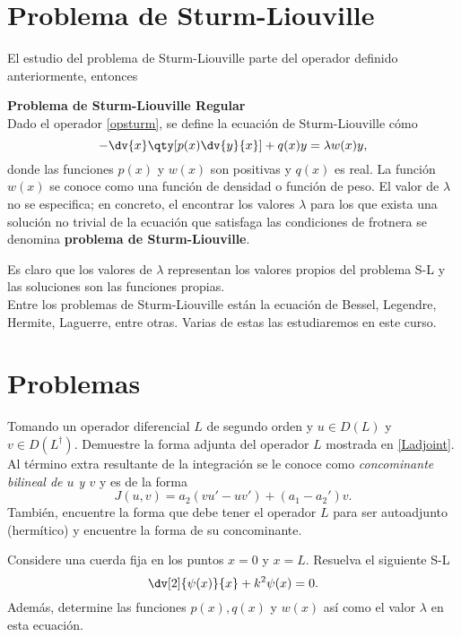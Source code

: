 \section*{Problema de Sturm-Liouville}
 
El estudio del problema de Sturm-Liouville parte del operador definido anteriormente, entonces

\begin{mdframed}[style=warning]
	{\Large \textbf{Problema de Sturm-Liouville Regular}} \\
	Dado el operador \eqref{opsturm}, se define la ecuación de Sturm-Liouville cómo
		$$ -\dv{x} \qty[p(x)\dv{y}{x}] + q(x) y = \lambda w(x) y, $$
	donde las funciones $p(x)$ y $w(x)$ son positivas y $q(x)$ es real. La función $w(x)$ se conoce como una función de densidad o función de peso. El valor de $\lambda$ no se especifica; en concreto, el encontrar los valores $\lambda$ para los que exista una solución no trivial de la ecuación que satisfaga las condiciones de frotnera se denomina \textbf{problema de Sturm-Liouville}.
\end{mdframed}

Es claro que los valores de $\lambda$ representan los valores propios del problema S-L y las soluciones son las funciones propias. \\


Entre los problemas de Sturm-Liouville están la ecuación de Bessel, Legendre, Hermite, Laguerre, entre otras. Varias de estas las estudiaremos en este curso. 




\pagebreak


\section*{Problemas}



\begin{ejercicio}
	Tomando un operador diferencial $L$ de segundo orden y $u \in D(L)$ y $v\in D(L^\dagger)$. Demuestre la forma adjunta del operador $L$ mostrada en \eqref{Ladjoint}. Al término extra resultante de la integración se le conoce como \textit{concominante bilineal de $u$ y $v$} y es de la forma
		$$ J(u,v) = a_2 (vu' - uv') + (a_1 - a_2')v. $$
	También, encuentre la forma que debe tener el operador $L$ para ser autoadjunto (hermítico) y encuentre la forma de su concominante.
\end{ejercicio}


\begin{ejercicio}
	Considere una cuerda fija en los puntos $x = 0$ y $x = L$. Resuelva el siguiente S-L
		$$ \dv[2]{\psi (x)}{x} + k^2 \psi (x) = 0. $$
	Además, determine las funciones $p(x),q(x)$ y $w(x)$ así como el valor $\lambda$ en esta ecuación.
\end{ejercicio}









